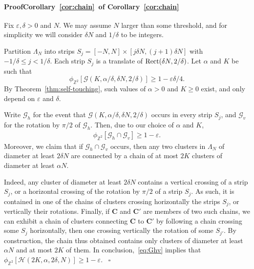 \documentclass[a4paper,oneside,11pt]{article}
\numberwithin{equation}{section}
\numberwithin{equation}{section}
\numberwithin{equation}{section}
\newenvironment{proof}[1][\relax]%
  {\paragraph{Proof\ifx#1\relax\else~of #1\fi}}%
  {~\hfill$\square$\par\bigskip}
\newcommand{\calG}{\mathcal{G}}
\newcommand{\calH}{\mathcal{H}}
\newcommand{\bbZ}{\mathbb{Z}}
\newcommand{\bfC}{\mathbf C}
\newcommand{\eps}{\varepsilon}
\newcommand{\La}{\Lambda}
\begin{document}
\begin{proof}[Corollary~\ref{cor:chain}]
	Fix $\eps, \delta > 0$ and $N$. 
	We may assume $N$ larger than some threshold, and for simplicity we will consider $\delta N$ and $1/\delta$ to be integers. 

	Partition $\La_N$ into strips $S_j = [-N,N] \times [j\delta N, (j+1)\delta N]$ with $-1/\delta \leq j <1/\delta$. 
	Each strip $S_j$ is a translate of ${\rm Rect}(\delta N, 2/\delta)$. 
	Let $\alpha$ and $K$ be such that 
	$$\phi_{\bbZ^2}[\calG(K,\alpha/\delta ,\delta N,2/\delta)] \geq 1 - \eps\delta/4.$$
	By Theorem~\ref{thm:self-touching}, such values of $\alpha > 0$ and $K\geq 0$ exist, and only depend on $\eps$ and $\delta$. 
	
	Write $\calG_h$ for the event that $\calG(K,\alpha/\delta,\delta N,2/\delta)$ occurs in every strip $S_j$, and $\calG_v$ for the rotation by $\pi/2$ of $\calG_h$. 
	Then, due to our choice of $\alpha$ and $K$,
	\begin{align}\label{eq:Ghv}
		\phi_{\bbZ^2}[\calG_h \cap \calG_v] \geq 1 - \eps.
	\end{align}
	Moreover, we claim that if $\calG_h \cap \calG_v$ occurs, then any two clusters in $\La_N$ of diameter at least $2 \delta N$ 
	are connected by a chain of at most $2K$ clusters of diameter at least $\alpha N$. 
	
	Indeed, any cluster of diameter at least $2 \delta N$ contains a vertical crossing of a strip $S_j$, 
	or a horizontal crossing of the rotation by $\pi/2$ of a strip $S_j$. 
	As such, it is contained in one of the chains of clusters crossing horizontally the strips $S_j$, or vertically their rotations. 
	Finally, if $\bfC$ and $\bfC'$ are members of two such chains, we can exhibit a chain of clusters connecting $\bfC$ to $\bfC'$ 
	by following a chain crossing some $S_j$ horizontally, then one crossing vertically the rotation of some $S_{j'}$. 
	By construction, the chain thus obtained contains only clusters of diameter at least $\alpha N$ and at most $2K$ of them. 
	In conclusion,~\eqref{eq:Ghv} implies that
	$\phi_{\bbZ^2}[\calH(2K,\alpha,2\delta,N)] \geq 1 - \eps. $
\end{proof}
\end{document}
